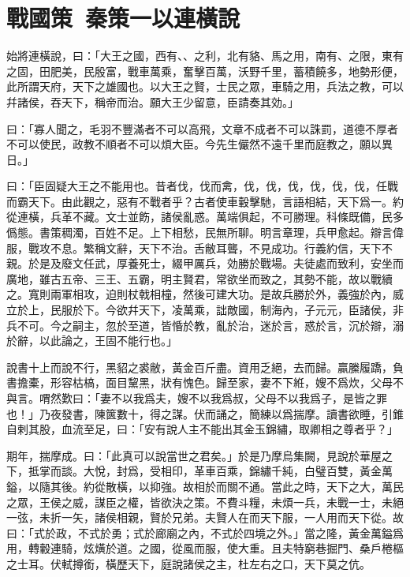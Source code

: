 \section[蘇秦以連橫說秦\quad{\small 戰國策 秦策一}]{{\normalsize 戰國策\ 秦策一}\quad {}以連橫說}
始將連橫說，曰：「大王之國，西有、、之利，北有貉、馬之用，南有、之限，東有
之固，田肥美，民殷富，戰車萬乘，奮擊百萬，沃野千里，蓄積饒多，地勢形便，此所謂天府，天下之雄國也。以大王之賢，士民之眾，車騎之用，兵法之教，可以幷諸侯，吞天下，稱帝而治。願大王少留意，臣請奏其効。」

曰：「寡人聞之，毛羽不豐滿者不可以高飛，文章不成者不可以誅罰，道德不厚者不可以使民，政教不順者不可以煩大臣。今先生儼然不遠千里而庭教之，願以異日。」

曰：「臣固疑大王之不能用也。昔者伐，伐而禽，伐，伐，伐，伐，伐，伐，任戰而霸天下。由此觀之，惡有不戰者乎？古者使車轂擊馳，言語相結，天下爲一。約從連橫，兵革不藏。文士並飭，諸侯亂惑。萬端俱起，不可勝理。科條既備，民多僞態。書策稠濁，百姓不足。上下相愁，民無所聊。明言章理，兵甲愈起。辯言偉服，戰攻不息。繁稱文辭，天下不治。舌敝耳聾，不見成功。行義約信，天下不親。於是及廢文任武，厚養死士，綴甲厲兵，効勝於戰場。夫徒處而致利，安坐而廣地，雖古五帝、三王、五霸，明主賢君，常欲坐而致之，其勢不能，故以戰續之。寬則兩軍相攻，迫則杖戟相橦，然後可建大功。是故兵勝於外，義強於內，威立於上，民服於下。今欲幷天下，凌萬乘，詘敵國，制海內，子元元，臣諸侯，非兵不可。今之嗣主，忽於至道，皆惛於教，亂於治，迷於言，惑於言，沉於辯，溺於辭，以此論之，王固不能行也。」

說書十上而說不行，黑貂之裘敝，黃金百斤盡。資用乏絕，去而歸。贏縢履蹻，負書擔橐，形容枯槁，面目黧黑，狀有愧色。歸至家，妻不下絍，嫂不爲炊，父母不與言。喟然歎曰：「妻不以我爲夫，嫂不以我爲叔，父母不以我爲子，是皆之罪也！」乃夜發書，陳篋數十，得之謀。伏而誦之，簡練以爲揣摩。讀書欲睡，引錐自剌其股，血流至足，曰：「安有說人主不能出其金玉錦繡，取卿相之尊者乎？」

期年，揣摩成。曰：「此真可以說當世之君矣。」於是乃摩烏集闕，見說於華屋之下，抵掌而談。大悅，封爲，受相印，革車百乘，錦繡千純，白璧百雙，黃金萬鎰，以隨其後。約從散橫，以抑強。故相於而關不通。當此之時，天下之大，萬民之眾，王侯之威，謀臣之權，皆欲決之策。不費斗糧，未煩一兵，未戰一士，未絕一弦，未折一矢，諸侯相親，賢於兄弟。夫賢人在而天下服，一人用而天下從。故曰：「式於政，不式於勇；式於廊廟之內，不式於四境之外。」當之隆，黃金萬鎰爲用，轉轂連騎，炫熿於道。之國，從風而服，使大重。且夫特窮巷掘門、桑戶棬樞之士耳。伏軾撙銜，橫歷天下，庭說諸侯之主，杜左右之口，天下莫之伉。

